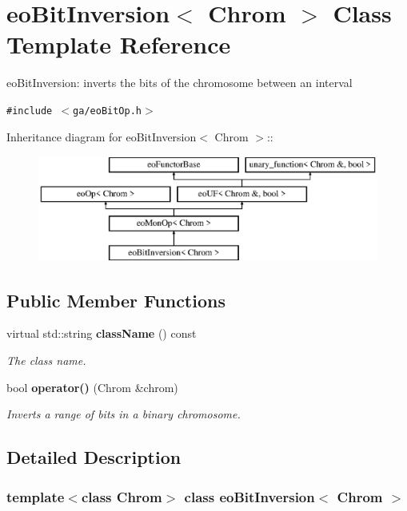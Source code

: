 \section{eo\-Bit\-Inversion$<$ Chrom $>$ Class Template Reference}
\label{classeo_bit_inversion}
eo\-Bit\-Inversion: inverts the bits of the chromosome between an interval  


{\tt \#include $<$ga/eo\-Bit\-Op.h$>$}

Inheritance diagram for eo\-Bit\-Inversion$<$ Chrom $>$::\begin{figure}[H]
\begin{center}
\leavevmode
\includegraphics[height=3.50548cm]{classeo_bit_inversion}
\end{center}
\end{figure}
\subsection*{Public Member Functions}
\begin{CompactItemize}
\item 
virtual std::string {\bf class\-Name} () const \label{classeo_bit_inversion_a0}

\begin{CompactList}\small\item\em The class name. \item\end{CompactList}\item 
bool {\bf operator()} (Chrom \&chrom)
\begin{CompactList}\small\item\em Inverts a range of bits in a binary chromosome. \item\end{CompactList}\end{CompactItemize}


\subsection{Detailed Description}
\subsubsection*{template$<$class Chrom$>$ class eo\-Bit\-Inversion$<$ Chrom $>$}

